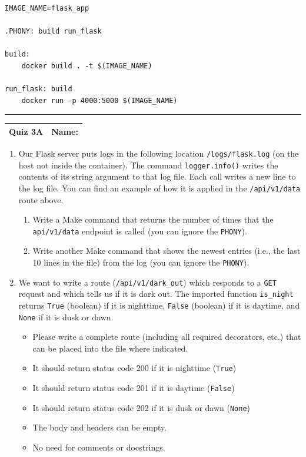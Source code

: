 \documentclass[11pt]{article}
\begin{document}
\begin{verbatim}
IMAGE_NAME=flask_app

.PHONY: build run_flask 

build:
    docker build . -t $(IMAGE_NAME)

run_flask: build
    docker run -p 4000:5000 $(IMAGE_NAME)

\end{verbatim}
{\color{lightgray}\hrule}

\clearpage

\begin{tabularx}{\textwidth}{l|X}
\textbf{Quiz 3A} &   \textbf{Name: } \\
\hline
\end{tabularx}

\vspace{1cm}

\begin{enumerate}
    \item Our Flask server puts logs in the following location \texttt{/logs/flask.log} (on the host not inside the container). The command \texttt{logger.info()} writes the contents of its string argument to that log file. Each call writes a new line to the log file. You can find an example of how it is applied in the \texttt{/api/v1/data} route above.

    \begin{enumerate}
    	\item Write a Make command that returns the number of times that the \texttt{api/v1/data} endpoint is called (you can ignore the \texttt{PHONY}). 
\vspace{4cm}
    	\item Write another Make command that shows the newest entries (i.e., the last 10 lines in the file) from the log (you can ignore the \texttt{PHONY}).
    \end{enumerate}
    
    \vspace{5cm}
    
    \item We want to write a route (\texttt{/api/v1/dark\_out}) which responds to a \texttt{GET} request and which tells us if it is dark out. The imported function \texttt{is\_night} returns \texttt{True} (boolean) if it is nighttime, \texttt{False} (boolean) if it is daytime, and \texttt{None} if it is dusk or dawn.
    \begin{itemize}
        \item Please write a complete route (including all required decorators, etc.) that can be placed into the file where indicated.
        \item It should return status code 200 if it is nighttime (\texttt{True})
        \item It should return status code 201 if it is daytime (\texttt{False})
        \item It should return status code 202 if it is dusk or dawn (\texttt{None})
        \item The body and headers can be empty.
        \item No need for comments or docstrings.
    \end{itemize}
    
\end{enumerate}
\end{document}
